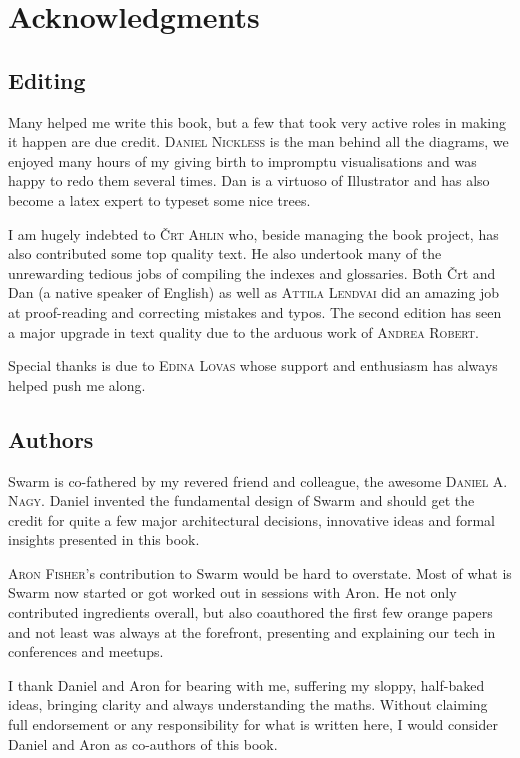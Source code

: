 \newcommand{\person}[1]{{\scshape #1}}
\chapter{Acknowledgments \statusgreen}

\section*{Editing}

Many helped me write this book, but a few that took very active roles in making it happen are due credit. \person{Daniel Nickless} is the man behind all the diagrams, we enjoyed many hours of my giving birth to impromptu visualisations and was happy to redo them several times. Dan is a virtuoso of Illustrator and has also become a latex expert to typeset some nice trees. 

I am hugely indebted to \person{Črt Ahlin} who, beside managing the book project, has also contributed some top quality text.
He also undertook many of the unrewarding tedious jobs of compiling the indexes and glossaries. Both Črt and Dan (a native speaker of English) as well as \person{Attila Lendvai} did an amazing job at proof-reading and correcting mistakes and typos.
The second edition has seen a major upgrade in text quality due to the arduous work of \person{Andrea Robert}.

Special thanks is due to \person{Edina Lovas} whose support and enthusiasm has always helped push me along. 

\section*{Authors}

Swarm is co-fathered by my revered friend and colleague, the awesome \person{Daniel A. Nagy}.  Daniel invented the fundamental design of Swarm and should get the credit for quite a few major architectural decisions, innovative ideas and formal insights presented in this book. 

\person{Aron Fisher}'s contribution to Swarm would be hard to overstate. Most of what is Swarm now started or got worked out in sessions with Aron.  He not only contributed ingredients overall, but also coauthored the first few orange papers and not least was always at the forefront, presenting and explaining our tech in conferences and meetups.

I thank Daniel and Aron for bearing with me, suffering my sloppy, half-baked ideas, bringing clarity and always understanding the maths.
Without claiming full endorsement or any responsibility for what is written here,
I would consider Daniel and Aron as co-authors of this book.

